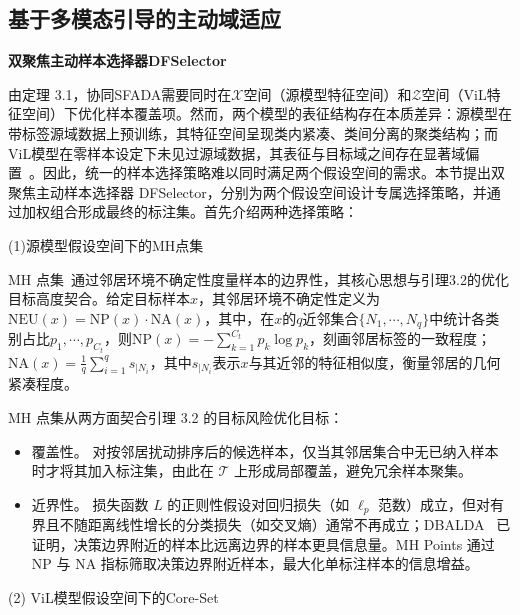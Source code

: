 \subsection{基于多模态引导的主动域适应}

\noindent\textbf{双聚焦主动样本选择器DFSelector}

由定理 3.1，协同SFADA需要同时在$\mathcal{X}$空间（源模型特征空间）和$\mathcal{Z}$空间（ViL特征空间）下优化样本覆盖项。然而，两个模型的表征结构存在本质差异：源模型在带标签源域数据上预训练，其特征空间呈现类内紧凑、类间分离的聚类结构；而ViL模型在零样本设定下未见过源域数据，其表征与目标域之间存在显著域偏置~\cite{ge2023domain,tang2024source}。因此，统一的样本选择策略难以同时满足两个假设空间的需求。本节提出双聚焦主动样本选择器 DFSelector，分别为两个假设空间设计专属选择策略，并通过加权组合形成最终的标注集。首先介绍两种选择策略：

(1)源模型假设空间下的MH点集

MH 点集~\cite{wang2023mhpl}通过邻居环境不确定性度量样本的边界性，其核心思想与引理3.2的优化目标高度契合。给定目标样本$x$，其邻居环境不确定性定义为$\mathrm{NEU}(x)=\mathrm{NP}(x)\cdot\mathrm{NA}(x)$，其中，在$x$的$q$近邻集合$\{N_1,\cdots,N_q\}$中统计各类别占比$p_1,\cdots,p_{C_t}$，则$\mathrm{NP}(x)=-\sum_{k=1}^{C_t}p_k\log p_k$，刻画邻居标签的一致程度；$\mathrm{NA}(x)=\frac{1}{q}\sum_{i=1}^{q}s_{|N_i}$，其中$s_{|N_i}$表示$x$与其近邻的特征相似度，衡量邻居的几何紧凑程度。

MH 点集从两方面契合引理 3.2 的目标风险优化目标：

\begin{itemize}
    \item 覆盖性。 对按邻居扰动排序后的候选样本，仅当其邻居集合中无已纳入样本时才将其加入标注集，由此在 $\mathcal{T}$ 上形成局部覆盖，避免冗余样本聚集。
    \item 近界性。 损失函数 $L$ 的正则性假设对回归损失（如 $\ell_p$ 范数）成立，但对有界且不随距离线性增长的分类损失（如交叉熵）通常不再成立；DBALDA~\cite{mathelin2022discrepancy} 已证明，决策边界附近的样本比远离边界的样本更具信息量。MH Points 通过 NP 与 NA 指标筛取决策边界附近样本，最大化单标注样本的信息增益。
\end{itemize}


(2) ViL模型假设空间下的Core-Set

